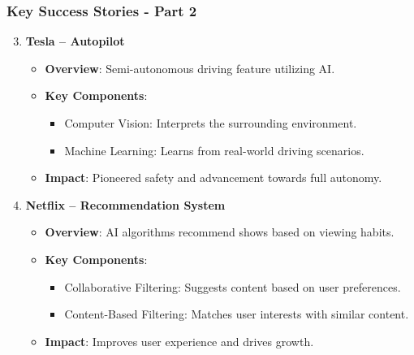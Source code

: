 \documentclass[aspectratio=169]{beamer}
\begin{document}
\begin{frame}[fragile]
    \frametitle{Key Success Stories - Part 2}
    \begin{enumerate}
        \setcounter{enumi}{2}
        \item \textbf{Tesla – Autopilot}
        \begin{itemize}
            \item \textbf{Overview}: Semi-autonomous driving feature utilizing AI.
            \item \textbf{Key Components}:
            \begin{itemize}
                \item Computer Vision: Interprets the surrounding environment.
                \item Machine Learning: Learns from real-world driving scenarios.
            \end{itemize}
            \item \textbf{Impact}: Pioneered safety and advancement towards full autonomy.
        \end{itemize}

        \item \textbf{Netflix – Recommendation System}
        \begin{itemize}
            \item \textbf{Overview}: AI algorithms recommend shows based on viewing habits.
            \item \textbf{Key Components}:
            \begin{itemize}
                \item Collaborative Filtering: Suggests content based on user preferences.
                \item Content-Based Filtering: Matches user interests with similar content.
            \end{itemize}
            \item \textbf{Impact}: Improves user experience and drives growth.
        \end{itemize}
    \end{enumerate}
\end{frame}
\end{document}

